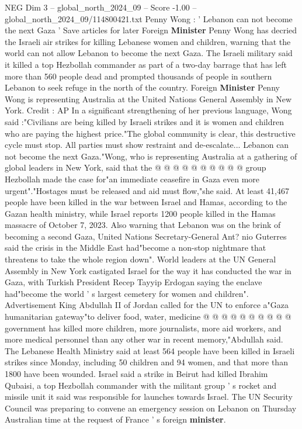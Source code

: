 \begin{textsample}{NEG Dim 3 – global\_north\_2024\_09 – Score -1.00 – global\_north\_2024\_09/114800421.txt}  \label{ex:f3_neg_293}
Penny Wong : ' Lebanon can not become the next Gaza ' Save articles for later Foreign \textbf{Minister} Penny Wong has decried the Israeli air strikes for killing Lebanese women and children, warning that the world can not allow Lebanon to become the next Gaza.
The Israeli military said it killed a top Hezbollah commander as part of a two-day barrage that has left more than 560 people dead and prompted thousands of people in southern Lebanon to seek refuge in the north of the country.
Foreign \textbf{Minister} Penny Wong is representing Australia at the United Nations General Assembly in New York.
Credit : AP In a significant strengthening of her previous language, Wong said :"Civilians are being killed by Israeli strikes and it is women and children who are paying the highest price."The global community is clear, this destructive cycle must stop.
All parties must show restraint and de-escalate...
Lebanon can not become the next Gaza."Wong, who is representing Australia at a gathering of global leaders in New York, said that the @ @ @ @ @ @ @ @ @ @ group Hezbollah made the case for"an immediate ceasefire in Gaza even more urgent"."Hostages must be released and aid must flow,"she said.
At least 41,467 people have been killed in the war between Israel and Hamas, according to the Gazan health ministry, while Israel reports 1200 people killed in the Hamas massacre of October 7, 2023.
Also warning that Lebanon was on the brink of becoming a second Gaza, United Nations Secretary-General Ant? nio Guterres said the crisis in the Middle East had"become a non-stop nightmare that threatens to take the whole region down".
World leaders at the UN General Assembly in New York castigated Israel for the way it has conducted the war in Gaza, with Turkish President Recep Tayyip Erdogan saying the enclave had"become the world ' s largest cemetery for women and children".
Advertisement King Abdullah II of Jordan called for the UN to enforce a"Gaza humanitarian gateway"to deliver food, water, medicine @ @ @ @ @ @ @ @ @ @ government has killed more children, more journalists, more aid workers, and more medical personnel than any other war in recent memory,"Abdullah said.
The Lebanese Health Ministry said at least 564 people have been killed in Israeli strikes since Monday, including 50 children and 94 women, and that more than 1800 have been wounded.
Israel said a strike in Beirut had killed Ibrahim Qubaisi, a top Hezbollah commander with the militant group ' s rocket and missile unit it said was responsible for launches towards Israel.
The UN Security Council was preparing to convene an emergency session on Lebanon on Thursday Australian time at the request of France ' s foreign \textbf{minister}.

\end{textsample}
